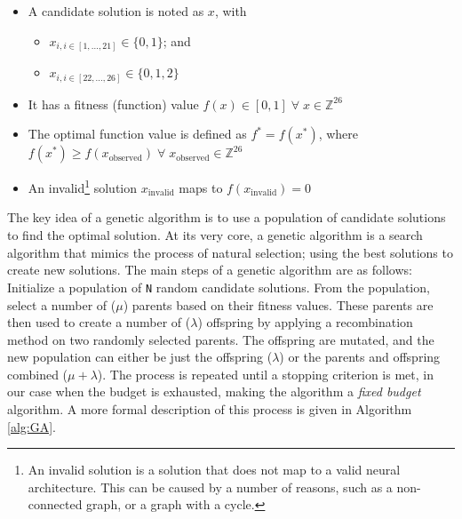 \documentclass{article}
\begin{document}
\begin{itemize}
    \item A candidate solution is noted as $x$, with
    \begin{itemize}
        \item $x_{i, i \in [1, \dots, 21]} \in \{0, 1\}$; and
        \item $x_{i, i \in [22, \dots, 26]} \in \{0, 1, 2\}$
    \end{itemize}
    \item It has a fitness (function) value $f(x) \in [0, 1] \; \forall \; x \in \mathbb{Z}^{26}$
    \item The optimal function value is defined as $f^* = f(x^*)$, where $f(x^*) \geq f(x_{\mathrm{observed}}) \; \forall \; x_{\mathrm{observed}} \in \mathbb{Z}^{26}$
    \item An invalid\footnote{
        An invalid solution is a solution that does not map to a valid neural architecture. 
        This can be caused by a number of reasons, such as a non-connected graph, or a graph with a cycle.
        } solution $x_{\mathrm{invalid}}$ maps to $f(x_{\mathrm{invalid}})=0$
\end{itemize}

The key idea of a genetic algorithm is to use a population of candidate solutions to find the optimal solution.
At its very core, a genetic algorithm is a search algorithm that mimics the process of natural selection; using the best solutions to create new solutions.
The main steps of a genetic algorithm are as follows:
Initialize a population of \texttt{N} random candidate solutions.
From the population, select a number of ($\mu$) parents based on their fitness values.
These parents are then used to create a number of ($\lambda$) offspring by applying a recombination method on two randomly selected parents.
The offspring are mutated, and the new population can either be just the offspring ($\lambda$) or the parents and offspring combined ($\mu+\lambda$).
The process is repeated until a stopping criterion is met, in our case when the budget is exhausted, making the algorithm a \textit{fixed budget} algorithm.
A more formal description of this process is given in Algorithm \ref{alg:GA}.

\end{document}
